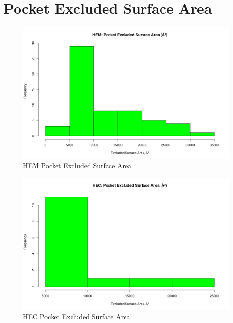 \section{Pocket Excluded Surface Area}
	\begin{figure}
		\caption{HEM Pocket Excluded Surface Area}
		\label{figs:HEM_pocketExcSA}
		\includegraphics[width=\linewidth]{7A/HEM_pocketExcSA}
	\end{figure}

	\begin{figure}
		\caption{HEC Pocket Excluded Surface Area}
		\label{figs:HEC_pocketExcSA}
		\includegraphics[width=\linewidth]{7A/HEC_pocketExcSA}
	\end{figure}
	
